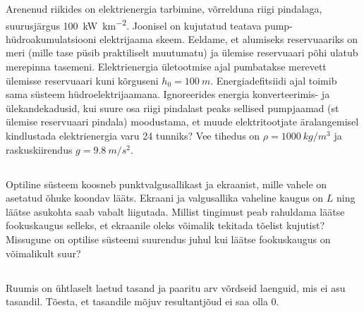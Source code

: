 \documentclass[10pt]{article}
\begin{document}
Arenenud riikides on elektrienergia tarbimine, võrrelduna riigi pindalaga, suurusjärgus \SI{100}{\kilo\watt\per\kilo\meter\squared}. Joonisel on kujutatud teatava pump-hüdroakumulatsiooni elektrijaama skeem. Eeldame, et alumiseks reservuaariks on meri (mille tase püsib praktiliselt muutumatu) ja ülemise reservuaari põhi ulatub merepinna tasemeni. Elektrienergia ületootmise ajal pumbatakse merevett ülemisse reservuaari kuni kõrguseni $h_0=\SI{100}{m}$. Energiadefitsiidi ajal toimib sama süsteem hüdroelektrijaamana. Ignoreerides energia konverteerimis- ja ülekandekadusid, kui suure osa riigi pindalast peaks sellised pumpjaamad (st ülemise reservuaari pindala) moodustama, et muude elektritootjate äralangemisel kindlustada elektrienergia varu 24 tunniks? Vee tihedus on $\rho=\SI{1000}{kg/m^3}$ ja raskuskiirendus $g=\SI{9.8}{m/s^2}$.
\probend
\bigskip
\newpage\subsection{\protect{}}


Optiline süsteem koosneb punktvalgusallikast ja ekraanist, mille vahele on asetatud õhuke koondav lääts. Ekraani ja valgusallika vaheline kaugus on $L$ ning läätse asukohta saab vabalt liigutada. Millist tingimust peab rahuldama läätse fookuskaugus selleks, et ekraanile oleks võimalik tekitada tõelist kujutist? Missugune on optilise süsteemi suurendus juhul kui läätse fookuskaugus on võimalikult suur?
\probend
\bigskip
\newpage\subsection{\protect{}}


Ruumis on ühtlaselt laetud tasand ja paaritu arv võrdseid laenguid, mis ei asu tasandil. Tõesta, et tasandile mõjuv resultantjõud ei saa olla 0.
\probend
\bigskip
\newpage\subsection{\protect{}}

\end{document}
